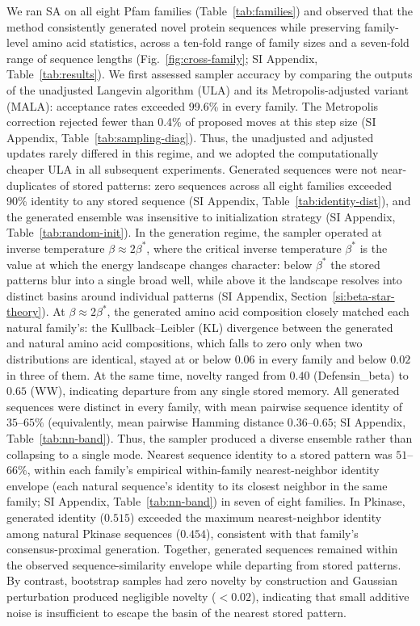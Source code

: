 
We ran SA on all eight Pfam families (Table~\ref{tab:families}) and observed that the method consistently generated novel protein sequences while preserving family-level amino acid statistics, across a ten-fold range of family sizes and a seven-fold range of sequence lengths (Fig.~\ref{fig:cross-family}; SI Appendix, Table~\ref{tab:results}). We first assessed sampler accuracy by comparing the outputs of the unadjusted Langevin algorithm (ULA) and its Metropolis-adjusted variant (MALA): acceptance rates exceeded 99.6\% in every family. The Metropolis correction rejected fewer than 0.4\% of proposed moves at this step size (SI Appendix, Table~\ref{tab:sampling-diag}). Thus, the unadjusted and adjusted updates rarely differed in this regime, and we adopted the computationally cheaper ULA in all subsequent experiments. Generated sequences were not near-duplicates of stored patterns: zero sequences across all eight families exceeded 90\% identity to any stored sequence (SI Appendix, Table~\ref{tab:identity-dist}), and the generated ensemble was insensitive to initialization strategy (SI Appendix, Table~\ref{tab:random-init}). In the generation regime, the sampler operated at inverse temperature $\beta \approx 2\beta^*$, where the critical inverse temperature $\beta^*$ is the value at which the energy landscape changes character: below $\beta^*$ the stored patterns blur into a single broad well, while above it the landscape resolves into distinct basins around individual patterns (SI Appendix, Section~\ref{si:beta-star-theory}). At $\beta \approx 2\beta^*$, the generated amino acid composition closely matched each natural family's: the Kullback--Leibler (KL) divergence between the generated and natural amino acid compositions, which falls to zero only when two distributions are identical, stayed at or below $0.06$ in every family and below $0.02$ in three of them. At the same time, novelty ranged from $0.40$ (Defensin\_beta) to $0.65$ (WW), indicating departure from any single stored memory. All generated sequences were distinct in every family, with mean pairwise sequence identity of $35$--$65\%$ (equivalently, mean pairwise Hamming distance $0.36$--$0.65$; SI Appendix, Table~\ref{tab:nn-band}). Thus, the sampler produced a diverse ensemble rather than collapsing to a single mode. Nearest sequence identity to a stored pattern was $51$--$66\%$, within each family's empirical within-family nearest-neighbor identity envelope (each natural sequence's identity to its closest neighbor in the same family; SI Appendix, Table~\ref{tab:nn-band}) in seven of eight families. In Pkinase, generated identity ($0.515$) exceeded the maximum nearest-neighbor identity among natural Pkinase sequences ($0.454$), consistent with that family's consensus-proximal generation. Together, generated sequences remained within the observed sequence-similarity envelope while departing from stored patterns. By contrast, bootstrap samples had zero novelty by construction and Gaussian perturbation produced negligible novelty ($<0.02$), indicating that small additive noise is insufficient to escape the basin of the nearest stored pattern.

